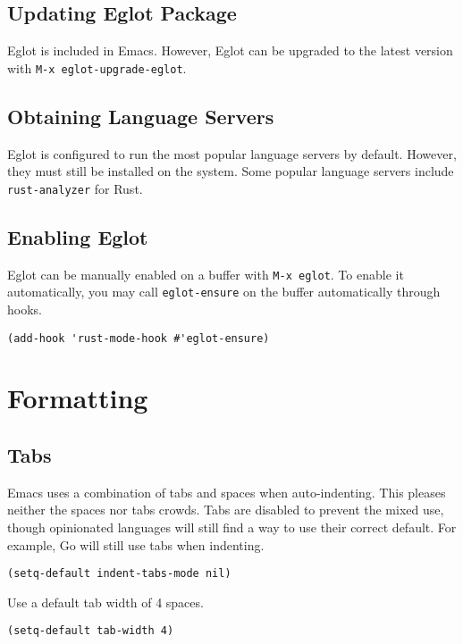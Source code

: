 \documentclass[11pt]{article}
\begin{document}
\subsection{Updating Eglot Package}
\label{sec:org8f55802}

Eglot is included in Emacs. However, Eglot can be upgraded to the latest version
with \texttt{M-x eglot-upgrade-eglot}.
\subsection{Obtaining Language Servers}
\label{sec:orge84f825}

Eglot is configured to run the most popular language servers by
default. However, they must still be installed on the system. Some popular
language servers include \texttt{rust-analyzer} for Rust.
\subsection{Enabling Eglot}
\label{sec:org3b1601b}

Eglot can be manually enabled on a buffer with \texttt{M-x eglot}. To enable it
automatically, you may call \texttt{eglot-ensure} on the buffer automatically through
hooks.

\begin{verbatim}
(add-hook 'rust-mode-hook #'eglot-ensure)
\end{verbatim}
\section{Formatting}
\label{sec:org77a5df4}

\subsection{Tabs}
\label{sec:orgdb600f9}

Emacs uses a combination of tabs and spaces when auto-indenting. This pleases
neither the spaces nor tabs crowds. Tabs are disabled to prevent the mixed use,
though opinionated languages will still find a way to use their correct
default. For example, Go will still use tabs when indenting.

\begin{verbatim}
(setq-default indent-tabs-mode nil)
\end{verbatim}

Use a default tab width of 4 spaces.

\begin{verbatim}
(setq-default tab-width 4)
\end{verbatim}
\end{document}
